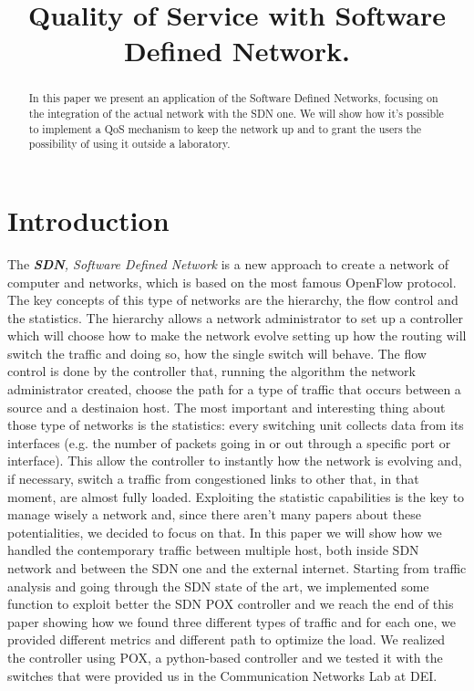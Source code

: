 \documentclass[conference,10pt]{IEEEtran}
\begin{document}
\title{Quality of Service with Software Defined Network.}

\author{
}

\maketitle

\begin{abstract}
In this paper we present an application of the Software Defined Networks, focusing on the integration of the actual network with the SDN one.
We will show how it's possible to implement a QoS mechanism to keep the network up and to grant the users the possibility of using it outside
a laboratory.
\end{abstract}

\section{Introduction}\label{sec:intro}
The \textit{\textbf{SDN}, Software Defined Network} is a new approach to create a network of computer and networks, which is based on the
most famous OpenFlow protocol. The key concepts of this type of networks are the hierarchy, the flow control and the statistics.
The hierarchy allows a network administrator to set up a controller which will choose how to make the network evolve setting up
how the routing will switch the traffic and doing so, how the single switch will behave.
The flow control is done by the controller that, running the algorithm the network administrator created, choose the path for a
type of traffic that occurs between a source and a destinaion host.
The most important and interesting thing about those type of networks is the statistics: every switching unit collects data from its
interfaces (e.g. the number of packets going in or out through a specific port or interface). This allow the controller to instantly
how the network is evolving and, if necessary, switch a traffic from congestioned links to other that, in that moment, are almost fully loaded.
Exploiting the statistic capabilities is the key to manage wisely a network and, since there aren't many papers about these potentialities,
we decided to focus on that. In this paper we will show how we handled the contemporary traffic between multiple host, both inside SDN network
and between the SDN one and the external internet. Starting from traffic analysis and going through the SDN state of the art, we implemented some function
to exploit better the SDN POX controller and we reach the end of this paper showing how we found three different types of traffic and
for each one, we provided different metrics and different path to optimize the load. We realized the controller using POX, a python-based controller
and we tested it with the switches that were provided us in the Communication Networks Lab at DEI.
\end{document}

